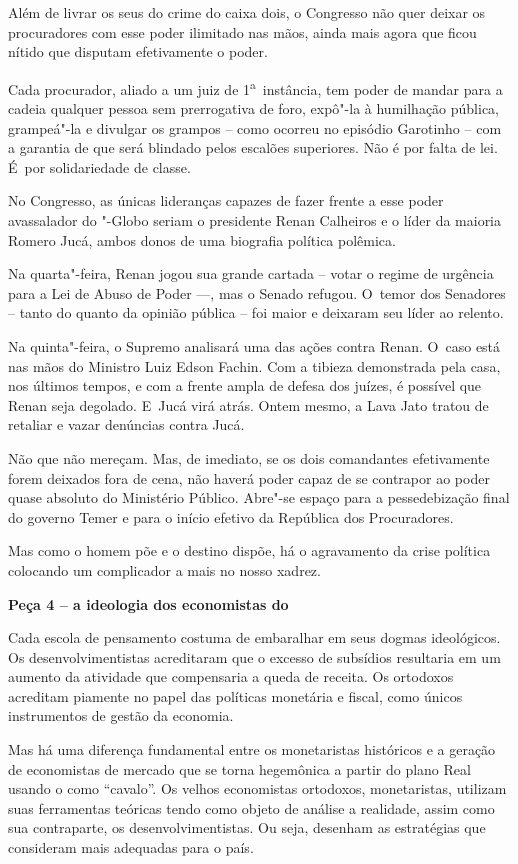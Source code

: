 Além de livrar os seus do crime do caixa dois, o Congresso não quer
deixar os procuradores com esse poder ilimitado nas mãos, ainda mais
agora que ficou nítido que disputam efetivamente o poder.

Cada procurador, aliado a um juiz de 1\textsuperscript{a}~instância, tem
poder de mandar para a cadeia qualquer pessoa sem prerrogativa de foro,
expô"-la à humilhação pública, grampeá"-la e divulgar os grampos -- como
ocorreu no episódio Garotinho -- com a garantia de que será blindado
pelos escalões superiores. Não é por falta de lei. É~por solidariedade
de classe.

No Congresso, as únicas lideranças capazes de fazer frente a esse poder
avassalador do "-Globo seriam o presidente Renan Calheiros e o líder
da maioria Romero Jucá, ambos donos de uma biografia política polêmica.

Na quarta"-feira, Renan jogou sua grande cartada -- votar o regime de
urgência para a Lei de Abuso de Poder \mbox{---,} mas o Senado refugou. O~temor
dos Senadores -- tanto do  quanto da opinião pública -- foi maior e
deixaram seu líder ao relento.

Na quinta"-feira, o Supremo analisará uma das ações contra Renan. O~caso
está nas mãos do Ministro Luiz Edson Fachin. Com a tibieza demonstrada
pela casa, nos últimos tempos, e com a frente ampla de defesa dos
juízes, é possível que Renan seja degolado. E~Jucá virá atrás. Ontem
mesmo, a Lava Jato tratou de retaliar e vazar denúncias contra Jucá.

Não que não mereçam. Mas, de imediato, se os dois comandantes
efetivamente forem deixados fora de cena, não haverá poder capaz de se
contrapor ao poder quase absoluto do Ministério Público. Abre"-se espaço
para a pessedebização final do governo Temer e para o início efetivo da
República dos Procuradores.

Mas como o homem põe e o destino dispõe, há o agravamento da crise
política colocando um complicador a mais no nosso xadrez.

\textbf{Peça 4 -- a ideologia dos economistas do }

Cada escola de pensamento costuma de embaralhar em seus dogmas
ideológicos. Os desenvolvimentistas acreditaram que o excesso de
subsídios resultaria em um aumento da atividade que compensaria a queda
de receita. Os ortodoxos acreditam piamente no papel das políticas
monetária e fiscal, como únicos instrumentos de gestão da economia.

Mas há uma diferença fundamental entre os monetaristas históricos e a
geração de economistas de mercado que se torna hegemônica a partir do
plano Real usando o  como ``cavalo''. Os velhos economistas
ortodoxos, monetaristas, utilizam suas ferramentas teóricas tendo como
objeto de análise a realidade, assim como sua contraparte, os
desenvolvimentistas. Ou seja, desenham as estratégias que consideram
mais adequadas para o país.

